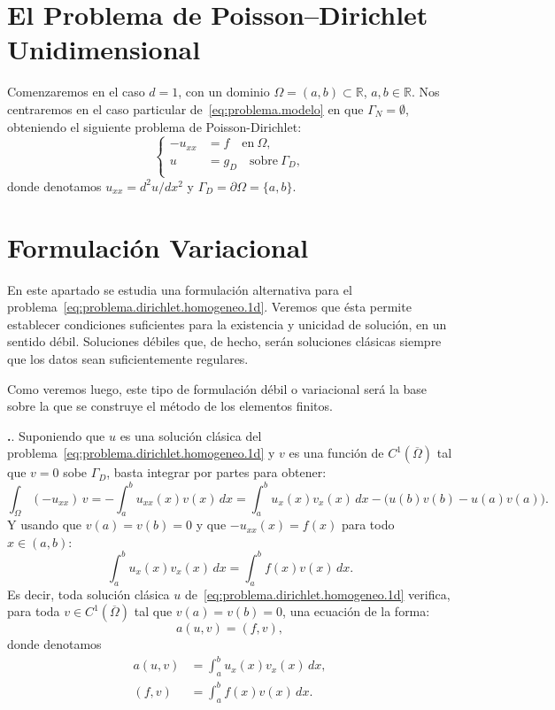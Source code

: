 \documentclass[11pt]{article}
\theoremstyle{plain}
\theoremstyle{definition}
\newcounter{stepnum}[section]
\newcommand{\step}{\bigskip\noindent\textbf{\thesection.\refstepcounter{stepnum}\thestepnum}.\enspace}
\newcommand{\R}{\ensuremath{\mathbb{R}}}
\newcommand{\en}{\quad\text{en}\ }
\newcommand{\sobre}{\quad\text{sobre}\ }
\newcommand{\uxx}{\ensuremath{u_{xx}}\xspace}
\begin{document}
\section{El Problema de Poisson--Dirichlet Unidimensional}

Comenzaremos en el caso $d=1$, con un dominio $\Omega=(a,b)\subset\R$, $a,b\in\R$. Nos centraremos en el caso particular de~\eqref{eq:problema.modelo} en que $\Gamma_N=\emptyset$, obteniendo el siguiente problema de Poisson-Dirichlet: 
\begin{equation}
  \left\{
    \begin{aligned}
      - \uxx &= f \en{\Omega}, \\
      u&=g_D \sobre{\Gamma_D}, \\
    \end{aligned}
  \right.
  \label{eq:problema.dirichlet.homogeneo.1d}
\end{equation}
donde denotamos $\uxx = d^2 u/d x^2$ y $\Gamma_D=\partial\Omega=\{a,b\}$. 


\section{Formulación Variacional}

En este apartado se estudia una formulación alternativa para el problema~\eqref{eq:problema.dirichlet.homogeneo.1d}. Veremos que ésta permite establecer condiciones suficientes para la existencia y unicidad de solución, en un sentido débil. Soluciones débiles que, de hecho, serán soluciones clásicas siempre que los datos sean suficientemente regulares.

Como veremos luego, este tipo de formulación débil o variacional será la base sobre la que  se construye el método de los elementos finitos.


\step
Suponiendo que $u$ es una solución clásica del problema~\eqref{eq:problema.dirichlet.homogeneo.1d} y $v$ es una función de $C^1(\overline\Omega)$ tal que $v=0$ sobe $\Gamma_D$, basta integrar por partes para obtener:
\begin{equation*}
  \int_\Omega (-\uxx)\,v  = -  \int_a^b \uxx(x) v(x) \,dx = 
  \int_a^b u_x(x) v_x(x)\,dx - \big( u(b)v(b) - u(a)v(a)  \big).
\end{equation*}
Y usando que $v(a)=v(b)=0$ y que $-\uxx(x)=f(x)$ para todo $x\in(a,b)$:
\[
  \int_a^b u_x(x) v_x(x)\,dx  = \int_a^b f(x) v(x) \, dx.
\]
Es decir, toda solución clásica $u$ de~\eqref{eq:problema.dirichlet.homogeneo.1d} verifica, para toda $v\in C^1(\overline\Omega)$ tal que $v(a)=v(b)=0$, una ecuación de la forma:
\begin{equation}
  a(u,v) = (f,v),
\end{equation}
donde denotamos
\begin{align}
  a(u,v)  &= \int_a^b u_x(x) v_x(x)\,dx,  
  \label{eq:forma.bilineal.a}
\\
  (f,v)  &= \int_a^b f(x) v(x) \, dx.
  \label{eq:producto.l2}
\end{align}
\end{document}
